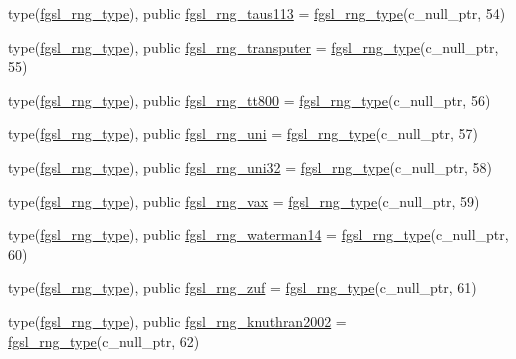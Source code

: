 \begin{DoxyCompactItemize}
\item 
type(\hyperlink{structfgsl_1_1fgsl__rng__type}{fgsl\+\_\+rng\+\_\+type}), public \hyperlink{namespacefgsl_a4b4cf5cdf021417e3147d6efff412544}{fgsl\+\_\+rng\+\_\+taus113} = \hyperlink{structfgsl_1_1fgsl__rng__type}{fgsl\+\_\+rng\+\_\+type}(c\+\_\+null\+\_\+ptr, 54)
\item 
type(\hyperlink{structfgsl_1_1fgsl__rng__type}{fgsl\+\_\+rng\+\_\+type}), public \hyperlink{namespacefgsl_ae6f6fd654d8c94d4ff5cf3a3eb274ccb}{fgsl\+\_\+rng\+\_\+transputer} = \hyperlink{structfgsl_1_1fgsl__rng__type}{fgsl\+\_\+rng\+\_\+type}(c\+\_\+null\+\_\+ptr, 55)
\item 
type(\hyperlink{structfgsl_1_1fgsl__rng__type}{fgsl\+\_\+rng\+\_\+type}), public \hyperlink{namespacefgsl_a1ec0bdbcac349e419b11ccb34d994e2d}{fgsl\+\_\+rng\+\_\+tt800} = \hyperlink{structfgsl_1_1fgsl__rng__type}{fgsl\+\_\+rng\+\_\+type}(c\+\_\+null\+\_\+ptr, 56)
\item 
type(\hyperlink{structfgsl_1_1fgsl__rng__type}{fgsl\+\_\+rng\+\_\+type}), public \hyperlink{namespacefgsl_aaa640575921c58278aa5f851482cd072}{fgsl\+\_\+rng\+\_\+uni} = \hyperlink{structfgsl_1_1fgsl__rng__type}{fgsl\+\_\+rng\+\_\+type}(c\+\_\+null\+\_\+ptr, 57)
\item 
type(\hyperlink{structfgsl_1_1fgsl__rng__type}{fgsl\+\_\+rng\+\_\+type}), public \hyperlink{namespacefgsl_a762bd46602bef4b69b29c76cbb184687}{fgsl\+\_\+rng\+\_\+uni32} = \hyperlink{structfgsl_1_1fgsl__rng__type}{fgsl\+\_\+rng\+\_\+type}(c\+\_\+null\+\_\+ptr, 58)
\item 
type(\hyperlink{structfgsl_1_1fgsl__rng__type}{fgsl\+\_\+rng\+\_\+type}), public \hyperlink{namespacefgsl_a85a32537847b642a47c056213ad0c1a6}{fgsl\+\_\+rng\+\_\+vax} = \hyperlink{structfgsl_1_1fgsl__rng__type}{fgsl\+\_\+rng\+\_\+type}(c\+\_\+null\+\_\+ptr, 59)
\item 
type(\hyperlink{structfgsl_1_1fgsl__rng__type}{fgsl\+\_\+rng\+\_\+type}), public \hyperlink{namespacefgsl_a47b92bfccacd568a2f9c08efbc2cb660}{fgsl\+\_\+rng\+\_\+waterman14} = \hyperlink{structfgsl_1_1fgsl__rng__type}{fgsl\+\_\+rng\+\_\+type}(c\+\_\+null\+\_\+ptr, 60)
\item 
type(\hyperlink{structfgsl_1_1fgsl__rng__type}{fgsl\+\_\+rng\+\_\+type}), public \hyperlink{namespacefgsl_a43051f5642335d5741ab956a7c9cdb64}{fgsl\+\_\+rng\+\_\+zuf} = \hyperlink{structfgsl_1_1fgsl__rng__type}{fgsl\+\_\+rng\+\_\+type}(c\+\_\+null\+\_\+ptr, 61)
\item 
type(\hyperlink{structfgsl_1_1fgsl__rng__type}{fgsl\+\_\+rng\+\_\+type}), public \hyperlink{namespacefgsl_a4148e5146be887be4fac343f69ce9399}{fgsl\+\_\+rng\+\_\+knuthran2002} = \hyperlink{structfgsl_1_1fgsl__rng__type}{fgsl\+\_\+rng\+\_\+type}(c\+\_\+null\+\_\+ptr, 62)

\end{DoxyCompactItemize}
